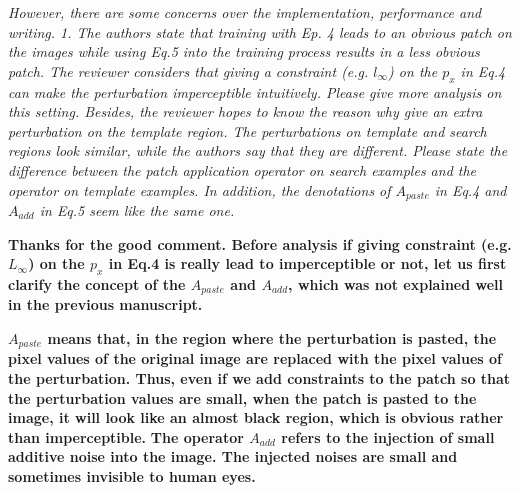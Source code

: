 \documentclass[12pt]{article}
\begin{document}
\textit{However, there are some concerns over the implementation, performance and writing. 1. The authors state that training with Ep. 4 leads to an obvious patch on the images while using Eq.5 into the training process results in a less obvious patch. The reviewer considers that giving a constraint (e.g. $l_{\infty}$) on the $p_x$ in Eq.4 can make the perturbation imperceptible intuitively. Please give more analysis on this setting.
Besides, the reviewer hopes to know the reason why give an extra perturbation on the template region. The perturbations on template and search regions look similar, while the authors say that they are different. Please state the difference between the patch application operator on search examples and the operator on template examples.
In addition, the denotations of $A_{paste}$ in Eq.4 and $A_{add}$ in Eq.5 seem like the same one.
}

\textbf{
Thanks for the good comment.
Before analysis if giving constraint (e.g. $L_{\infty}$) on the $p_x$ in Eq.4 is really lead to imperceptible or not, let us first clarify the concept of the $A_{paste}$ and $A_{add}$, which was not explained well in the previous manuscript.}

\textbf{%
$A_{paste}$ means that,
in the region where the perturbation is pasted, the pixel values of the original image are replaced with the pixel values of the perturbation.
Thus, even if we add constraints to the patch so that the perturbation values are small, when the patch is pasted to the image, it will look like an almost black region, which is obvious rather than imperceptible.}
\textbf{The operator $A_{add}$ refers to the injection of small additive noise into the image. The injected noises are small and sometimes invisible to human eyes.
}

\end{document}
